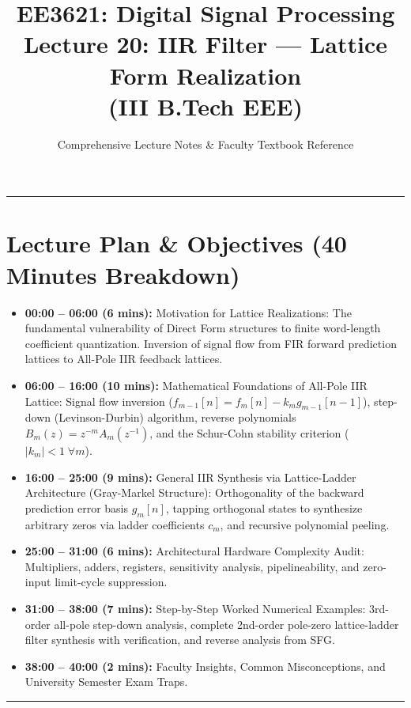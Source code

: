 \documentclass[11pt,a4paper]{article}
\title{\textbf{EE3621: Digital Signal Processing} \\ \Large Lecture 20: IIR Filter — Lattice Form Realization \\ \large (III B.Tech EEE)}
\author{Comprehensive Lecture Notes \& Faculty Textbook Reference}
\date{}
\begin{document}
\maketitle

\noindent\rule{\textwidth}{0.5pt}

\section*{Lecture Plan \& Objectives (40 Minutes Breakdown)}
\begin{itemize}
    \item \textbf{00:00 -- 06:00 (6 mins):} Motivation for Lattice Realizations: The fundamental vulnerability of Direct Form structures to finite word-length coefficient quantization. Inversion of signal flow from FIR forward prediction lattices to All-Pole IIR feedback lattices.
    \item \textbf{06:00 -- 16:00 (10 mins):} Mathematical Foundations of All-Pole IIR Lattice: Signal flow inversion ($f_{m-1}[n] = f_m[n] - k_m g_{m-1}[n-1]$), step-down (Levinson-Durbin) algorithm, reverse polynomials $B_m(z) = z^{-m} A_m(z^{-1})$, and the Schur-Cohn stability criterion ($|k_m| < 1 \; \forall m$).
    \item \textbf{16:00 -- 25:00 (9 mins):} General IIR Synthesis via Lattice-Ladder Architecture (Gray-Markel Structure): Orthogonality of the backward prediction error basis $g_m[n]$, tapping orthogonal states to synthesize arbitrary zeros via ladder coefficients $c_m$, and recursive polynomial peeling.
    \item \textbf{25:00 -- 31:00 (6 mins):} Architectural Hardware Complexity Audit: Multipliers, adders, registers, sensitivity analysis, pipelineability, and zero-input limit-cycle suppression.
    \item \textbf{31:00 -- 38:00 (7 mins):} Step-by-Step Worked Numerical Examples: 3rd-order all-pole step-down analysis, complete 2nd-order pole-zero lattice-ladder filter synthesis with verification, and reverse analysis from SFG.
    \item \textbf{38:00 -- 40:00 (2 mins):} Faculty Insights, Common Misconceptions, and University Semester Exam Traps.
\end{itemize}

\noindent\rule{\textwidth}{0.5pt}
\end{document}
